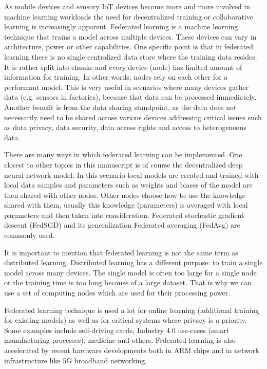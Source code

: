 \documentclass[b5paper]{book}
\begin{document}
As mobile devices and sensory IoT devices become more and more involved in machine learning workloads the need for decentralized training or collaborative learning is increasingly apparent. Federated learning is a machine learning technique that trains a model across multiple devices. These devices can vary in architecture, power or other capabilities. One specific point is that in federated learning there is no single centralized data store where the training data resides. It is rather split into chunks and every device (node) has limited amount of information for training. In other words, nodes rely on each other for a performant model. This is very useful in scenarios where many devices gather data (e.g. sensors in factories), because that data can be processed immediately. Another benefit is from the data sharing standpoint, as the data does not necessarily need to be shared across various devices addressing critical issues such as data privacy, data security, data access rights and access to heterogeneous data.

There are many ways in which federated learning can be implemented. One closest to other topics in this manuscript is of course the decentralized deep neural network model. In this scenario local models are created and trained with local data samples and parameters such as weights and biases of the model are then shared with other nodes. Other nodes choose how to use the knowledge shared with them, usually this knowledge (parameters) is averaged with local parameters and then taken into consideration. Federated stochastic gradient descent (FedSGD) and its generalization Federated averaging (FedAvg) are commonly used.

It is important to mention that federated learning is not the same term as distributed learning. Distributed learning has a different purpose: to train a single model across many devices. The single model is often too large for a single node or the training time is too long because of a large dataset. That is why we can use a set of computing nodes which are used for their processing power.

Federated learning technique is used a lot for online learning (additional training for existing models) as well as for critical systems where privacy is a priority. Some examples include self-driving cards, Industry 4.0 use-cases (smart manufacturing processes), medicine and others. Federated learning is also accelerated by recent hardware developments both in ARM chips and in network infrastructure like 5G broadband networking.
\end{document}
